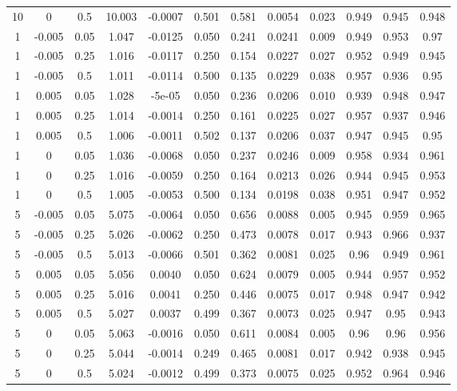 \documentclass[12pt,english]{article}
\begin{document}
\begin{spacing}{1.9}
\begin{flushleft}
\begin{table}[htb]
\begin{tabular}{cccccccccccc}
10	&0	&0.5	&10.003		&-0.0007	&0.501	&0.581	&0.0054	&0.023	&0.949	&0.945	&0.948\\
1	&-0.005	&0.05	&1.047	&-0.0125	&0.050	&0.241	&0.0241	&0.009	&0.949	&0.953	&0.97\\
1	&-0.005	&0.25	&1.016	&-0.0117	&0.250	&0.154	&0.0227	&0.027	&0.952	&0.949	&0.945\\
1	&-0.005	&0.5	&1.011	&-0.0114	&0.500	&0.135	&0.0229	&0.038	&0.957	&0.936	&0.95\\
1	&0.005	&0.05	&1.028  &-5e-05	      &0.050	&0.236	&0.0206	&0.010	&0.939	&0.948	&0.947\\
1	&0.005	&0.25	&1.014	&-0.0014	&0.250	&0.161	&0.0225	&0.027	&0.957	&0.937	&0.946\\
1	&0.005	&0.5	&1.006	&-0.0011	&0.502	&0.137	&0.0206	&0.037	&0.947	&0.945	&0.95\\
1	&0	&0.05	&1.036		&-0.0068	&0.050	&0.237	&0.0246	&0.009	&0.958	&0.934	&0.961\\
1	&0	&0.25	&1.016		&-0.0059	&0.250	&0.164	&0.0213	&0.026	&0.944	&0.945	&0.953\\
1	&0	&0.5	&1.005		&-0.0053	&0.500	&0.134	&0.0198	&0.038	&0.951	&0.947	&0.952\\
5	&-0.005	&0.05	&5.075	&-0.0064	&0.050	&0.656	&0.0088	&0.005	&0.945	&0.959	&0.965\\
5	&-0.005	&0.25	&5.026	&-0.0062	&0.250	&0.473	&0.0078	&0.017	&0.943	&0.966	&0.937\\
5	&-0.005	&0.5	&5.013	&-0.0066	&0.501	&0.362	&0.0081	&0.025	&0.96	&0.949	&0.961\\
5	&0.005	&0.05	&5.056	&0.0040		&0.050	&0.624	&0.0079	&0.005	&0.944	&0.957	&0.952\\
5	&0.005	&0.25	&5.016	&0.0041		&0.250	&0.446	&0.0075	&0.017	&0.948	&0.947	&0.942\\
5	&0.005	&0.5	&5.027	&0.0037		&0.499	&0.367	&0.0073	&0.025	&0.947	&0.95	&0.943\\
5	&0	&0.05		&5.063	&-0.0016	&0.050	&0.611	&0.0084	&0.005	&0.96	&0.96	&0.956\\
5	&0	&0.25		&5.044	&-0.0014	&0.249	&0.465	&0.0081	&0.017	&0.942	&0.938	&0.945\\
5	&0	&0.5		&5.024	&-0.0012	&0.499	&0.373	&0.0075	&0.025	&0.952	&0.964	&0.946\\
  \hline
  \end{tabular}
  \label{tab:simexp}
\end{table}
\clearpage


\end{flushleft}
\end{spacing}
\end{document}
